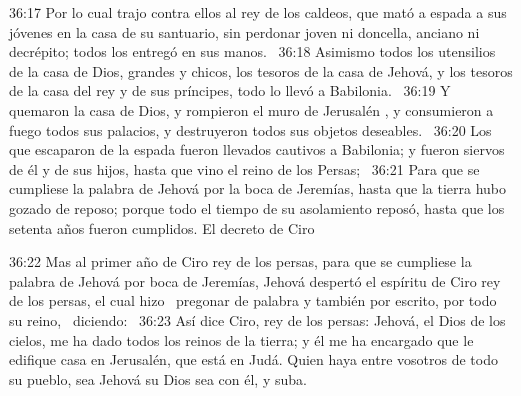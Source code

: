 																																				36:17 Por lo cual trajo contra ellos al rey de los caldeos, que mató a espada a sus jóvenes en la casa de su santuario, sin perdonar joven ni doncella, anciano ni decrépito; todos los entregó en sus manos.  
																																				36:18 Asimismo todos los utensilios de la casa de Dios, grandes y chicos, los tesoros de la casa de Jehová, y los tesoros de la casa del rey y de sus príncipes, todo lo llevó a Babilonia.  
																																				36:19 Y quemaron la casa de Dios, y rompieron el muro de Jerusalén , y consumieron a fuego todos sus palacios, y destruyeron todos sus objetos deseables.  
																																				36:20 Los que escaparon de la espada fueron llevados cautivos a Babilonia; y fueron siervos de él y de sus hijos, hasta que vino el reino de los Persas;  
																																				36:21 Para que se cumpliese la palabra de Jehová por la boca de Jeremías, hasta que la tierra hubo gozado de reposo; porque todo el tiempo de su asolamiento reposó, hasta que los setenta años fueron cumplidos. 
																																				El decreto de Ciro 
																																				
																																				36:22 Mas al primer año de Ciro rey de los persas, para que se cumpliese la palabra de Jehová por boca de Jeremías, Jehová despertó el espíritu de Ciro rey de los persas, el cual hizo  pregonar de palabra y también por escrito, por todo su reino,  diciendo:  
																																				36:23 Así dice Ciro, rey de los persas: Jehová, el Dios de los cielos, me ha dado todos los reinos de la tierra; y él me ha encargado que le edifique casa en Jerusalén, que está en Judá. Quien haya entre vosotros de todo su pueblo, sea Jehová su Dios sea con él, y suba.
																									
